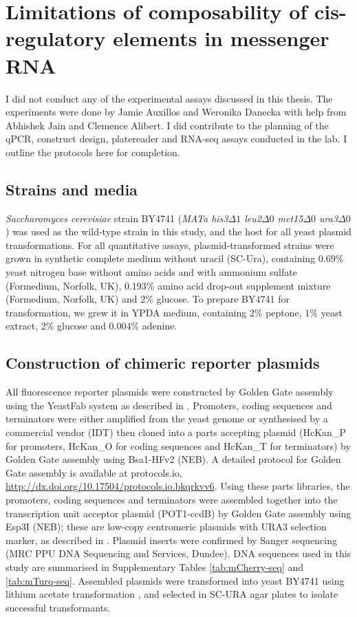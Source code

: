\documentclass[../main.tex]{subfiles}
\begin{document}
\section{{Limitations} of composability of cis-regulatory elements in messenger RNA}

I did not conduct any of the experimental assays discussed in this thesis. The experiments were done by Jamie Auxillos and Weronika Danecka with help from Abhishek Jain and Clemence Alibert. I did contribute to the planning of the qPCR, construct design, platereader and RNA-seq assays conducted in the lab. I outline the protocols here for completion.

\subsection{Strains and media}

\emph{Saccharomyces cerevisiae} strain BY4741 (\emph{MATa his3\(\Delta1\) leu2\(\Delta0\) met15\(\Delta0\) ura3\(\Delta0\)}) was used as the wild-type strain in this study, and the host for all yeast plasmid transformations.
For all quantitative assays, plasmid-transformed strains were grown in synthetic complete medium without uracil (SC-Ura), containing 0.69\% yeast nitrogen base without amino acids and with ammonium sulfate (Formedium, Norfolk, UK), 0.193\% amino acid drop-out supplement mixture (Formedium, Norfolk, UK) and 2\% glucose.
To prepare BY4741 for transformation, we grew it in YPDA medium, containing 2\% peptone, 1\% yeast extract, 2\% glucose and 0.004\% adenine.

\subsection{Construction of chimeric reporter plasmids}

All fluorescence reporter plasmids were constructed by Golden Gate assembly using the YeastFab system as described in \parencite{Garcia2018}.
Promoters, coding sequences and terminators were either amplified from the yeast genome or synthesised by a commercial vendor (IDT) then cloned into a parts accepting plasmid (HcKan\_P for promoters, HcKan\_O for coding sequences and HcKan\_T for terminators) by Golden Gate assembly using Bsa1-HFv2 (NEB).
A detailed protocol for Golden Gate assembly is available at protocols.io, \url{http://dx.doi.org/10.17504/protocols.io.bkqrkvv6}.
Using these parts libraries, the promoters, coding sequences and terminators were assembled together into the transcription unit acceptor plasmid (POT1-ccdB) by Golden Gate assembly using Esp3I (NEB); these are low-copy centromeric plasmids with URA3 selection marker, as described in \parencite{Garcia2018}.
Plasmid inserts were confirmed by Sanger sequencing (MRC PPU DNA Sequencing and Services, Dundee).
DNA sequences used in this study are summarised in Supplementary Tables \ref{tab:mCherry-seq} and \ref{tab:mTurq-seq}.
Assembled plasmids were transformed into yeast BY4741 using lithium acetate transformation \parencite{Gietz2002a}, and selected in SC-URA agar plates to isolate successful transformants.
\end{document}
